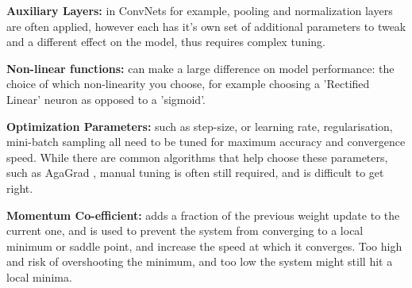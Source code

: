 \documentclass[a4paper,11pt,titlepage]{article}
\begin{document}
		\par 
		\textbf{Auxiliary Layers:} in ConvNets for example, pooling and normalization layers are often applied, however each has it's own set of additional parameters to tweak and a different effect on the model, thus requires complex tuning.
		\par 
		\textbf{Non-linear functions:} can make a large difference on model performance: the choice of which non-linearity you choose, for example choosing a 'Rectified Linear' neuron as opposed to a 'sigmoid'. 
		\par 
		\textbf{Optimization Parameters:} such as step-size, or learning rate, regularisation, mini-batch sampling all need to be tuned for maximum accuracy and convergence speed. While there are common algorithms that help choose these parameters, such as AgaGrad \cite{Duchi2011}, manual tuning is often still required, and is difficult to get right.
		\par
		\textbf{Momentum Co-efficient:} adds a fraction of the previous weight update to the current one, and is used to prevent the system from converging to a local minimum or saddle point, and increase the speed at which it converges. Too high and risk of overshooting the minimum, and too low the system might still hit a local minima.
\\\
\end{document}
